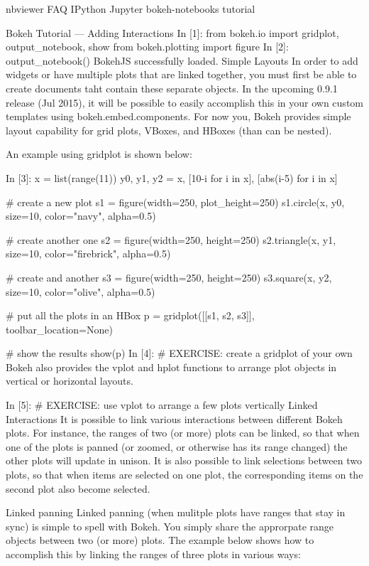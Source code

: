 nbviewer
FAQ
IPython
Jupyter
bokeh-notebooks   tutorial
 	
Bokeh Tutorial — Adding Interactions
In [1]:
from bokeh.io import gridplot, output_notebook, show
from bokeh.plotting import figure
In [2]:
output_notebook()
BokehJS successfully loaded.
Simple Layouts
In order to add widgets or have multiple plots that are linked together, you must first be able to create documents taht contain these separate objects. In the upcoming 0.9.1 release (Jul 2015), it will be possible to easily accomplish this in your own custom templates using bokeh.embed.components. For now you, Bokeh provides simple layout capability for grid plots, VBoxes, and HBoxes (than can be nested).

An example using gridplot is shown below:

In [3]:
x = list(range(11))
y0, y1, y2 = x, [10-i for i in x], [abs(i-5) for i in x]

# create a new plot
s1 = figure(width=250, plot_height=250)
s1.circle(x, y0, size=10, color="navy", alpha=0.5)

# create another one
s2 = figure(width=250, height=250)
s2.triangle(x, y1, size=10, color="firebrick", alpha=0.5)

# create and another
s3 = figure(width=250, height=250)
s3.square(x, y2, size=10, color="olive", alpha=0.5)

# put all the plots in an HBox
p = gridplot([[s1, s2, s3]], toolbar_location=None)

# show the results
show(p)
In [4]:
# EXERCISE: create a gridplot of your own
Bokeh also provides the vplot and hplot functions to arrange plot objects in vertical or horizontal layouts.

In [5]:
# EXERCISE: use vplot to arrange a few plots vertically
Linked Interactions
It is possible to link various interactions between different Bokeh plots. For instance, the ranges of two (or more) plots can be linked, so that when one of the plots is panned (or zoomed, or otherwise has its range changed) the other plots will update in unison. It is also possible to link selections between two plots, so that when items are selected on one plot, the corresponding items on the second plot also become selected.

Linked panning
Linked panning (when mulitple plots have ranges that stay in sync) is simple to spell with Bokeh. You simply share the approrpate range objects between two (or more) plots. The example below shows how to accomplish this by linking the ranges of three plots in various ways:

